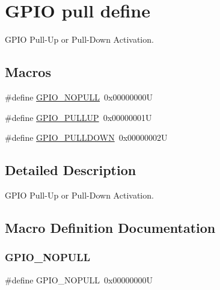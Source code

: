 \hypertarget{group___g_p_i_o__pull__define}{}\section{G\+P\+IO pull define}
\label{group___g_p_i_o__pull__define}


G\+P\+IO Pull-\/\+Up or Pull-\/\+Down Activation.  


\subsection*{Macros}
\begin{DoxyCompactItemize}
\item 
\#define \mbox{\hyperlink{group___g_p_i_o__pull__define_ga5c2862579882c1cc64e36d38fbd07a4c}{G\+P\+I\+O\+\_\+\+N\+O\+P\+U\+LL}}~0x00000000U
\item 
\#define \mbox{\hyperlink{group___g_p_i_o__pull__define_gae689bc8f5c42d6df7bd54a8dd372e072}{G\+P\+I\+O\+\_\+\+P\+U\+L\+L\+UP}}~0x00000001U
\item 
\#define \mbox{\hyperlink{group___g_p_i_o__pull__define_ga75d958d0410c36da7f27d1f4f5c36c14}{G\+P\+I\+O\+\_\+\+P\+U\+L\+L\+D\+O\+WN}}~0x00000002U
\end{DoxyCompactItemize}


\subsection{Detailed Description}
G\+P\+IO Pull-\/\+Up or Pull-\/\+Down Activation. 



\subsection{Macro Definition Documentation}
\mbox{\label{group___g_p_i_o__pull__define_ga5c2862579882c1cc64e36d38fbd07a4c}} 
\subsubsection{\texorpdfstring{G\+P\+I\+O\+\_\+\+N\+O\+P\+U\+LL}{GPIO\_NOPULL}}
{\footnotesize\ttfamily \#define G\+P\+I\+O\+\_\+\+N\+O\+P\+U\+LL~0x00000000U}

